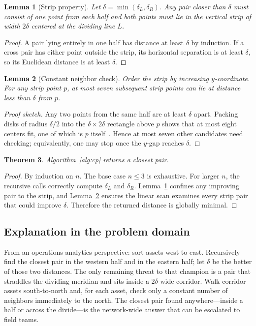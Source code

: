 \documentclass[sigconf,review=false]{acmart}
\newtheorem{theorem}{Theorem}
\newtheorem{lemma}[theorem]{Lemma}
\theoremstyle{definition}
\begin{document}
\begin{lemma}[Strip property]
\label{lem:strip}
Let $\delta=\min(\delta_L,\delta_R)$. Any pair closer than $\delta$ must
consist of one point from each half and both points must lie in the vertical
strip of width $2\delta$ centered at the dividing line $L$.
\end{lemma}

\begin{proof}
A pair lying entirely in one half has distance at least $\delta$ by
induction. If a cross pair has either point outside the strip, its
horizontal separation is at least $\delta$, so its Euclidean distance is at
least $\delta$.
\end{proof}

\begin{lemma}[Constant neighbor check]
\label{lem:box}
Order the strip by increasing $y$-coordinate. For any strip point $p$, at
most seven subsequent strip points can lie at distance less than $\delta$
from $p$.
\end{lemma}

\begin{proof}[Proof sketch]
Any two points from the same half are at least $\delta$ apart. Packing
disks of radius $\delta/2$ into the $\delta\times 2\delta$ rectangle above
$p$ shows that at most eight centers fit, one of which is $p$
itself~\cite{clrs2009}. Hence at most seven other candidates need checking;
equivalently, one may stop once the $y$-gap reaches $\delta$.
\end{proof}

\begin{theorem}
Algorithm~\ref{alg:cp} returns a closest pair.
\end{theorem}

\begin{proof}
By induction on $n$. The base case $n\le 3$ is exhaustive. For larger $n$,
the recursive calls correctly compute $\delta_L$ and $\delta_R$.
Lemma~\ref{lem:strip} confines any improving pair to the strip, and
Lemma~\ref{lem:box} ensures the linear scan examines every strip pair that
could improve $\delta$. Therefore the returned distance is globally minimal.
\end{proof}

\subsection{Explanation in the problem domain}
\label{sec:dac-domain}

From an operations-analytics perspective: sort assets west-to-east. Recursively
find the closest pair in the western half and in the eastern half; let
$\delta$ be the better of those two distances. The only remaining threat to
that champion is a pair that straddles the dividing meridian and sits inside
a $2\delta$-wide corridor. Walk corridor assets south-to-north and, for each
asset, check only a constant number of neighbors immediately to the north.
The closest pair found anywhere---inside a half or across the divide---is
the network-wide answer that can be escalated to field teams.
\end{document}
